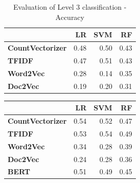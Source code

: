 \documentclass[12pt, a4paper, titlepage]{article}
\begin{document}
  \begin{table}[]
  \begin{tabular}{lrrr}
    \hline
    {} &    \textbf{LR}  &   \textbf{SVM}  &    \textbf{RF}  \\
    \hline
    \textbf{CountVectorizer}  &  0.48 &  0.50 &  0.43 \\
    \textbf{TFIDF}            &  0.47 &  0.51 &  0.43 \\
    \textbf{Word2Vec}         &  0.28 &  0.14 &  0.35 \\
    \textbf{Doc2Vec}          &  0.19 &  0.20 &  0.31 \\
    \hline
    \end{tabular}
    \caption{\label{tab: T7} Evaluation of Level 3 classification - Accuracy}
  \end{table}
    
    \begin{table}[]
    \caption{\label{tab: T8} Evaluation of Level 3 classification - Macro}
  \end{table}


  \begin{table}[]
  \begin{tabular}{lrrr}
    \hline
    {} &    \textbf{LR} &   \textbf{SVM} &    \textbf{RF} \\
    \hline
    \textbf{CountVectorizer} &  0.54 &  0.52 &  0.47 \\
    \textbf{TFIDF}           &  0.53 &  0.54 &  0.49 \\
    \textbf{Word2Vec}        &  0.34 &  0.28 &  0.39 \\
    \textbf{Doc2Vec}         &  0.24 &  0.28 &  0.36 \\
    \textbf{BERT}            &  0.51 &  0.49 &  0.45 \\
    \hline
    \end{tabular}
  \end{table}
\end{document}
